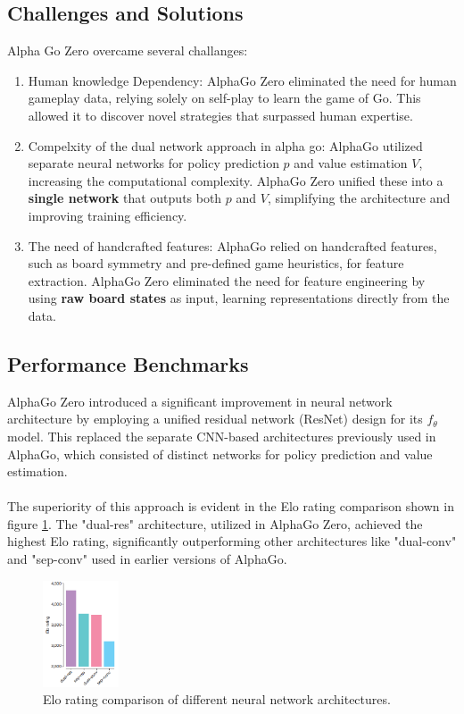 \subsection{Challenges and Solutions}
Alpha Go Zero overcame several challanges:
\begin{enumerate}
    \item Human knowledge Dependency: AlphaGo Zero eliminated the need for human gameplay
          data, relying solely on self-play to learn the game of Go. This allowed it to
          discover novel strategies that surpassed human expertise.
    \item Compelxity of the dual network approach in alpha go: AlphaGo utilized separate
          neural networks for policy prediction $p$ and value estimation $V$, increasing
          the computational complexity. AlphaGo Zero unified these into a \textbf{single
              network} that outputs both $p$ and $V$, simplifying the architecture and
          improving training efficiency.
    \item The need of handcrafted features: AlphaGo relied on handcrafted features, such
          as board symmetry and pre-defined game heuristics, for feature extraction.
          AlphaGo Zero eliminated the need for feature engineering by using \textbf{raw
              board states} as input, learning representations directly from the data.
\end{enumerate}

\subsection{Performance Benchmarks}

AlphaGo Zero introduced a significant improvement in neural network
architecture by employing a unified residual network (ResNet) design for its
$f_\theta$ model. This replaced the separate CNN-based architectures previously
used in AlphaGo, which consisted of distinct networks for policy prediction and
value estimation. \\\\ The superiority of this approach is evident in the Elo
rating comparison shown in figure \ref{fig:results_agz}. The "dual-res"
architecture, utilized in AlphaGo Zero, achieved the highest Elo rating,
significantly outperforming other architectures like "dual-conv" and "sep-conv"
used in earlier versions of AlphaGo.

\begin{figure}[ht]
    \centering
    \includegraphics[width=0.20\textwidth]{sections/5AlphaGo Zero/Results_agz.png}
    \caption{Elo rating comparison of different neural network architectures.}
    \label{fig:results_agz}
\end{figure}

